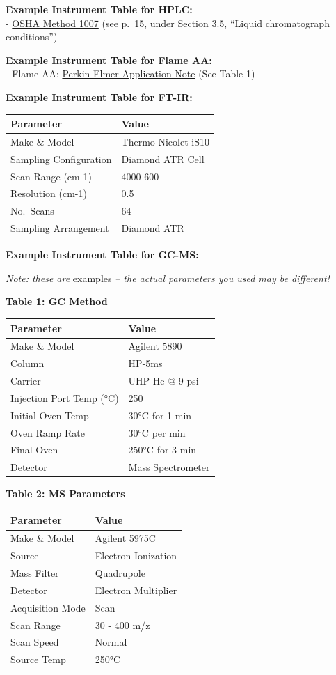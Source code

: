 \documentclass[]{tufte-book}
\begin{document}
\textbf{Example Instrument Table for HPLC:}\\
- \href{https://www.osha.gov/dts/sltc/methods/mdt/mdt1007/1007.pdf}{OSHA Method 1007} (see p.~15, under Section 3.5, ``Liquid chromatograph conditions'')

\textbf{Example Instrument Table for Flame AA:}\\
- Flame AA: \href{https://www.perkinelmer.com/lab-solutions/resources/docs/PinAAcleMineralsinVitaminsbyFAAAppNote.pdf}{Perkin Elmer Application Note} (See Table 1)

\textbf{Example Instrument Table for FT-IR:}

\begin{longtable}[]{@{}ll@{}}
\toprule
Parameter & Value\tabularnewline
\midrule
\endhead
Make \& Model & Thermo-Nicolet iS10\tabularnewline
Sampling Configuration & Diamond ATR Cell\tabularnewline
Scan Range (cm-1) & 4000-600\tabularnewline
Resolution (cm-1) & 0.5\tabularnewline
No.~Scans & 64\tabularnewline
Sampling Arrangement & Diamond ATR\tabularnewline
\bottomrule
\end{longtable}

\textbf{Example Instrument Table for GC-MS:}

\emph{Note: these are} examples \emph{-- the actual parameters you used may be different!}

\textbf{Table 1: GC Method}

\begin{longtable}[]{@{}ll@{}}
\toprule
Parameter & Value\tabularnewline
\midrule
\endhead
Make \& Model & Agilent 5890\tabularnewline
Column & HP-5ms\tabularnewline
Carrier & UHP He @ 9 psi\tabularnewline
Injection Port Temp (°C) & 250\tabularnewline
Initial Oven Temp & 30°C for 1 min\tabularnewline
Oven Ramp Rate & 30°C per min\tabularnewline
Final Oven & 250°C for 3 min\tabularnewline
Detector & Mass Spectrometer\tabularnewline
\bottomrule
\end{longtable}

\textbf{Table 2: MS Parameters}

\begin{longtable}[]{@{}ll@{}}
\toprule
Parameter & Value\tabularnewline
\midrule
\endhead
Make \& Model & Agilent 5975C\tabularnewline
Source & Electron Ionization\tabularnewline
Mass Filter & Quadrupole\tabularnewline
Detector & Electron Multiplier\tabularnewline
Acquisition Mode & Scan\tabularnewline
Scan Range & 30 - 400 m/z\tabularnewline
Scan Speed & Normal\tabularnewline
Source Temp & 250°C\tabularnewline
\bottomrule
\end{longtable}
\end{document}
